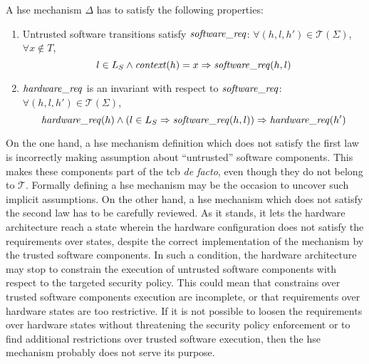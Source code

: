 \begin{definition}
  \label{def:speccert:laws}
  A \ac{hse} mechanism $\Delta$ has to satisfy the following properties:
  \begin{enumerate}
  \item Untrusted software transitions satisfy $\mathit{software\_req}$:
    $\forall (h, l, h') \in \mathcal{T}(\Sigma)$, $\forall x \not\in T$,
    \[
      l \in L_S \wedge \mathit{context}(h) = x \Rightarrow \mathit{software\_req}(h,
      l)
    \]
  \item $\mathit{hardware\_req}$ is an invariant with respect to
    $\mathit{software\_req}$: $\forall (h, l, h') \in \mathcal{T}(\Sigma)$,
    \[
      \mathit{hardware\_req}(h) \wedge (l \in L_S \Rightarrow
      \mathit{software\_req}(h,l)) \Rightarrow \mathit{hardware\_req}(h')
    \]
  \end{enumerate}
\end{definition}

On the one hand, a \ac{hse} mechanism definition which does not satisfy the
first law is incorrectly making assumption about ``untrusted'' software
components.
%
This makes these components part of the \ac{tcb} \emph{de facto}, even though
they do not belong to $\mathcal{T}$.
%
Formally defining a \ac{hse} mechanism may be the occasion to uncover such
implicit assumptions.
%
On the other hand, a \ac{hse} mechanism which does not satisfy the second law
has to be carefully reviewed.
%
As it stands, it lets the hardware architecture reach a state wherein the
hardware configuration does not satisfy the requirements over states, despite
the correct implementation of the mechanism by the trusted software components.
%
In such a condition, the hardware architecture may stop to constrain the
execution of untrusted software components with respect to the targeted security
policy.
%
This could mean that constrains over trusted software components execution are
incomplete, or that requirements over hardware states are too restrictive.
%
If it is not possible to loosen the requirements over hardware states without
threatening the security policy enforcement or to find additional restrictions
over trusted software execution, then the \ac{hse} mechanism probably does not
serve its purpose.

